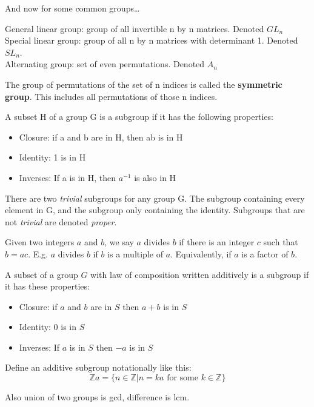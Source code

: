 And now for some common groups\ldots

\begin{definition}
  General linear group: group of all invertible n by n matrices. Denoted $GL_{n}$ \\
  Special linear group: group of all n by n matrices with determinant 1. Denoted $SL_{n}$. \\
  Alternating group: set of even permutations. Denoted $A_{n}$ \\
\end{definition}

\begin{definition}
  The group of permutations of the set of n indices is called the \textbf{symmetric group}.
  This includes all permutations of those n indices.

\end{definition}

\begin{definition}
  A subset H of a group G is a subgroup if it has the following properties:
  \begin{itemize}
    \item Closure: if a and b are in H, then ab is in H
    \item Identity: 1 is in H
    \item Inverses: If a is in H, then $a^{-1}$ is also in H
  \end{itemize}

  There are two \emph{trivial} subgroups for any group G. The subgroup
  containing every element in G, and the subgroup only containing the identity.
  Subgroups that are not \emph{trivial} are denoted \emph{proper}.

\end{definition}

\begin{definition}
Given two integers $a$ and $b$, we say $a$ divides $b$ if there is an integer
$c$ such that $b=ac$. E.g. $a$ divides $b$ if $b$ is a multiple of $a$.
Equivalently, if $a$ is a factor of $b$.
\end{definition}

\begin{definition}
  A subset of a group $G$ with law of composition written additively is a subgroup
  if it has these properties:
  \begin{itemize}
      \item Closure: if $a$ and $b$ are in $S$ then $a + b$ is in $S$
      \item Identity: 0 is in $S$
      \item Inverses: If $a$ is in $S$ then $-a$ is in $S$
  \end{itemize}

  Define an additive subgroup notationally like this:
  \[\mathbb{Z}a = \{n \in \mathbb{Z} | n = ka \text{ for some } k \in \mathbb{Z}\}\]

  Also union of two groups is gcd, difference is lcm.
\end{definition}

